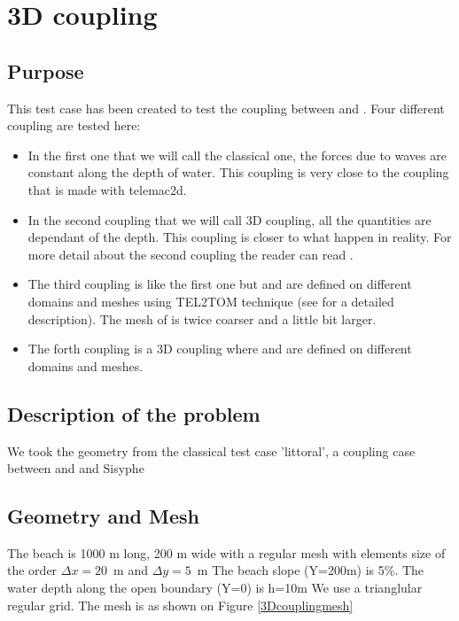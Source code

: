 \chapter{3D coupling}
%
%
\section{Purpose}
%
This test case has been created to test the coupling between \tomawac and
. Four different coupling are tested here:
\begin{itemize}
\item In the first one that we will call the classical one, the forces due to
  waves are constant along the depth of water. This coupling is very close to
  the coupling that is made with telemac2d.
\item In the second coupling that we will call 3D coupling, all the
quantities are dependant of the depth. This coupling is closer to what
happen in reality. For more detail about the second coupling the reader can
read \cite{Teles2013}.
\item The third coupling is like the first one but \tomawac and  are
  defined on different domains and meshes using TEL2TOM technique
  (see \cite{breugem2019} for a detailed description). The mesh of \tomawac is twice coarser and a little bit larger. 
\item The forth coupling is a 3D coupling where \tomawac and  are
  defined on different domains and meshes.
\end{itemize}
%
\section{Description of the problem}
We took the geometry from the classical test case 'littoral', a coupling case
between \tomawac and  and Sisyphe
\section{Geometry and Mesh}
%
The beach is 1000 m long, 200 m wide with a regular mesh with
elements size of the order $\Delta x=20$~m and $\Delta y=5$~m
 The beach slope (Y=200m) is 5\%.
 The water depth along the open boundary (Y=0) is h=10m
We use a trianglular regular grid.  
The mesh is as shown on Figure \ref{3Dcouplingmesh}


